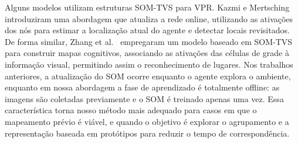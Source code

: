 \documentclass[letterpaper, 10 pt, conference]{ieeeconf}  %
\begin{document}
Alguns modelos utilizam estruturas \ac{SOM-TVS} para \ac{VPR}. Kazmi e Mertsching~\cite{gsom_vpr} introduziram uma abordagem que atualiza a rede online, utilizando as ativações dos nós para estimar a localização atual do agente e detectar locais revisitados. De forma similar, Zhang et al.~\cite{gsomapp1} empregaram um modelo baseado em \ac{SOM-TVS} para construir mapas cognitivos, associando as ativações das células de grade à informação visual, permitindo assim o reconhecimento de lugares. Nos trabalhos anteriores, a atualização do SOM ocorre enquanto o agente explora o ambiente, enquanto em nossa abordagem a fase de aprendizado é totalmente offline: as imagens são coletadas previamente e o SOM é treinado apenas uma vez. Essa característica torna nosso método mais adequado para casos em que o mapeamento prévio é viável, e quando o objetivo é explorar o agrupamento e a representação baseada em protótipos para reduzir o tempo de correspondência.






\end{document}
